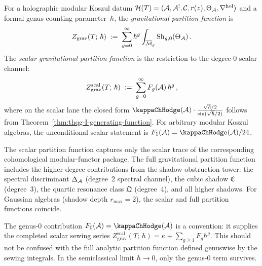 \begin{definition}
For a holographic modular Koszul datum $\mathcal{H}(T) = (\mathcal{A}, \mathcal{A}^!, \mathcal{C}, r(z), \Theta_{\mathcal{A}}, \nabla^{\mathrm{hol}})$ and a formal genus-counting parameter~$\hbar$, the \emph{gravitational partition function} is
\begin{equation}%
Z_{\mathrm{grav}}(T;\,\hbar) \;:=\; \sum_{g=0}^{\infty} \hbar^g \int_{\overline{\mathcal{M}}_{g}} \operatorname{Sh}_{g,0}(\Theta_\cA)\,.
\end{equation}
The \emph{scalar gravitational partition function} is the restriction to the degree-$0$ scalar channel:
\begin{equation}%
Z_{\mathrm{grav}}^{\mathrm{scal}}(T;\,\hbar) \;:=\; \sum_{g=0}^{\infty} F_g(\cA)\,\hbar^g\,,
\end{equation}
where on the scalar lane the closed form
$\kappaChHodge(\cA) \cdot \frac{\sqrt{\hbar}/2}{\sin(\sqrt{\hbar}/2)}$
follows from Theorem~\ref{thm:thqg-I-generating-function}. For
arbitrary modular Koszul algebras, the unconditional scalar statement
is $F_1(\cA)=\kappaChHodge(\cA)/24$.
\end{definition}

\begin{remark}
The scalar partition function captures only the scalar trace of the corresponding cohomological modular-functor package. The full gravitational partition function includes the higher-degree contributions from the shadow obstruction tower: the spectral discriminant $\Delta_{\mathcal{A}}$ (degree~$2$ spectral channel), the cubic shadow $\mathfrak{C}$ (degree~$3$), the quartic resonance class $\mathfrak{Q}$ (degree~$4$), and all higher shadows. For Gaussian algebras (shadow depth $r_{\max} = 2$), the scalar and full partition functions coincide.
\end{remark}

\begin{remark}
The genus-$0$ contribution $F_0(\cA) = \kappaChHodge(\cA)$ is a convention: it
supplies the completed scalar sewing series
$Z_{\mathrm{grav}}^{\mathrm{scal}}(T;\,\hbar)
= \kappa + \sum_{g \geq 1} F_g \hbar^g$. This should not be confused
with the full analytic partition function defined genuswise by the
sewing integrals. In the semiclassical limit $\hbar \to 0$, only the
genus-$0$ term survives.
\end{remark}

